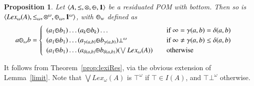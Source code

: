 \documentclass[a4paper]{elsarticle}
\newtheorem{proposition}{Proposition}
\newcommand{\monop}{\otimes}
\newcommand{\1}{\mathbf{1}}
\def\odiv{{ \ominus\hspace{-8pt}:}\;}
\begin{document}
\begin{proposition}\label{prop:lexiResOmega}
	Let $\langle A, \leq, \monop, \odiv, \1 \rangle$ be a residuated POM with bottom.
	Then so is $\langle Lex_\omega(A), \leq_\omega, \monop^\omega, \odiv_\omega, \1^\omega \rangle$,
	with $\odiv_w$ defined as
	\[
	a \odiv_\omega b = \begin{cases}
	\begin{array}{lcl}
	(a_1 \odiv b_1) \ldots
	(a_k  \odiv b_k) \ldots & & \mbox{if  } \infty = \gamma(a,b) = \delta(a,b) \\
	(a_1 \odiv b_1) \ldots  (a_{\gamma(a, b)}  \odiv b_{\gamma(a, b)}) 	
	\bot^\omega & & \mbox{if  } \infty \neq \gamma(a,b) \leq \delta(a,b) \\
	(a_1 \odiv b_1) \ldots  (a_{\delta(a, b)}  \odiv b_{\delta(a, b)})
	(\bigvee Lex_{\omega}(A)) & & \mbox{otherwise}
	\end{array}
	\end{cases}
	\]
\end{proposition}

It follows from Theorem~\ref{prop:lexiRes}, via the obvious extension of Lemma~\ref{limit}.
Note that $\bigvee Lex_\omega(A)$ is $\top^\omega$
if $\top \in I(A)$, and  $\top \bot^\omega$ otherwise.
\end{document}
